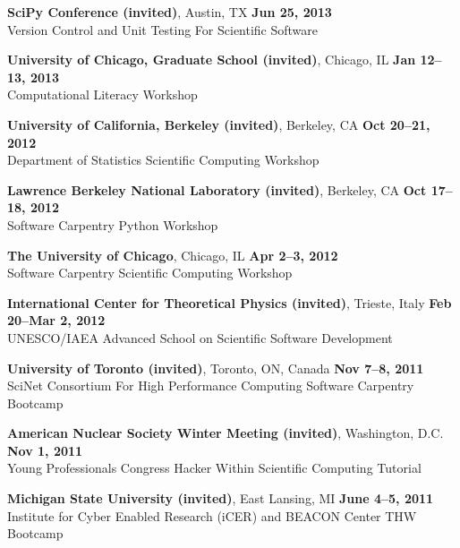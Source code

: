 \documentclass[margin,line]{resume}
\begin{document}
\begin{resume}
    \textbf{SciPy Conference (invited)}, Austin, TX \hfill \textbf{Jun 25, 2013}\\
    Version Control and Unit Testing For Scientific Software

    \textbf{University of Chicago, Graduate School (invited)}, Chicago, IL \hfill \textbf{Jan 12--13, 2013}\\
    Computational Literacy Workshop

    \textbf{University of California, Berkeley (invited)}, Berkeley, CA \hfill \textbf{Oct 20--21, 2012}\\
    Department of Statistics Scientific Computing Workshop

    \textbf{Lawrence Berkeley National Laboratory (invited)}, Berkeley, CA \hfill \textbf{Oct 17--18, 2012}\\
    Software Carpentry Python Workshop

    \textbf{The University of Chicago}, Chicago, IL \hfill \textbf{Apr 2--3, 2012}\\
    Software Carpentry Scientific Computing Workshop

    \textbf{International Center for Theoretical Physics (invited)}, Trieste, Italy \hfill \textbf{Feb 20--Mar 2, 2012}\\
    UNESCO/IAEA Advanced School on Scientific Software Development

    \textbf{University of Toronto (invited)}, Toronto, ON, Canada \hfill \textbf{Nov 7--8, 2011}\\
      SciNet Consortium For High Performance Computing Software Carpentry Bootcamp

    \textbf{American Nuclear Society Winter Meeting (invited)}, Washington, D.C.  \hfill \textbf{Nov 1, 2011}\\
    Young Professionals Congress Hacker Within Scientific Computing Tutorial

    \textbf{Michigan State University (invited)}, East Lansing, MI \hfill \textbf{June 4--5, 2011}\\
     Institute for Cyber Enabled Research (iCER) and BEACON Center THW Bootcamp


\end{resume}
\end{document}
